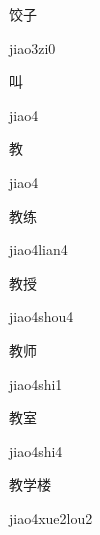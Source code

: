 \begin{multicols*}{2}
\begin{verbete}[jiao3zi0]{饺子}
\begin{pronuncia}{jiao3zi0}
\end{pronuncia}
\end{verbete}

\begin{verbete}[jiao4]{叫}
\begin{pronuncia}{jiao4}
\end{pronuncia}
\end{verbete}

\begin{verbete}[jiao4]{教}
\begin{pronuncia}{jiao4}
\end{pronuncia}
\end{verbete}

\begin{verbete}{教练}
\begin{pronuncia}{jiao4lian4}
\end{pronuncia}
\end{verbete}

\begin{verbete}{教授}
\begin{pronuncia}{jiao4shou4}
\end{pronuncia}
\end{verbete}

\begin{verbete}{教师}
\begin{pronuncia}{jiao4shi1}
\end{pronuncia}
\end{verbete}

\begin{verbete}{教室}
\begin{pronuncia}{jiao4shi4}
\end{pronuncia}
\end{verbete}

\begin{verbete}{教学楼}
\begin{pronuncia}{jiao4xue2lou2}
\end{pronuncia}
\end{verbete}


\end{multicols*}
